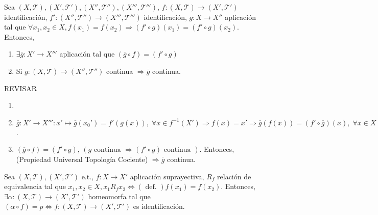 \begin{prop}
  Sea $( X, \mathcal{T} ), ( X', \mathcal{T}' ), ( X'', \mathcal{T}'' ), ( X''', \mathcal{T}''' )$, $f: ( X, \mathcal{T} ) \to ( X', \mathcal{T}' )$ identificación, $f': ( X'', \mathcal{T}'' ) \to ( X''', \mathcal{T}''' )$ identificación, $g: X \to X''$ aplicación tal que $\forall x_{1}, x_{2} \in X, f(x_{1}) = f(x_{2}) \Rightarrow (f' \circ g)(x_{1}) = (f' \circ g)(x_{2})$. Entonces,
  \begin{enumerate}[label=(\roman*)]
    \item $\exists \overline{g}: X' \to X'''$ aplicación tal que $(\overline{g} \circ f) = (f' \circ g)$
    \item Si $ g: ( X, \mathcal{T} ) \to ( X'', \mathcal{T}'' )$ continua $\Rightarrow \overline{g}$ continua.
  \end{enumerate}
\end{prop}

REVISAR

\begin{dem}
  \begin{enumerate}[label=(\roman*)]
    \item []
    \item $\overline{g}: X' \to X''': x' \mapsto \overline{g}(x_{0}') = f'(g(x)), \; \forall x \in f^{-1}(X') \Rightarrow f(x) = x' \Rightarrow \overline{g}(f(x)) = (f' \circ \overline{g})(x), \; \forall x \in X \Leftrightarrow (\overline{g} \circ f) = (f' \circ g)$.
    \item $(\overline{g} \circ f) = (f' \circ g)$, $(g \text{ continua } \Rightarrow (f' \circ g) \text{ continua })$. Entonces, (Propiedad Universal Topología Cociente) $\Rightarrow \overline{g}$ continua.
  \end{enumerate}
\end{dem}

\begin{prop}
  Sea $( X, \mathcal{T} ), ( X', \mathcal{T}' )$ e.t., $f: X \to X'$ aplicación suprayectiva, $R_{f}$ relación de equivalencia tal que $x_{1}, x_{2} \in X, x_{1} R_{f} x_{2} \Leftrightarrow(\text{ def. }) f(x_{1}) = f(x_{2})$. Entonces, $\exists \alpha: ( X, \mathcal{T} ) \to ( X', \mathcal{T}' )$ homeomorfa tal que $(\alpha \circ f) = p \Leftrightarrow f: ( X, \mathcal{T} ) \to ( X', \mathcal{T}' )$ es identificación.
\end{prop}

